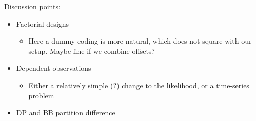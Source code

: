 \documentclass[11pt,a4paper]{article}
\theoremstyle{definition} %
\theoremstyle{case}
\newcommand{\FD}[1]{\textcolor{red}{Fabian: #1 }}
\begin{document}
Discussion points:
\begin{itemize}
    \item Factorial designs
    \begin{itemize}
        \item Here a dummy coding is more natural, which does not square with our setup. Maybe fine if we combine offsets?
    \end{itemize}
    \item Dependent observations
    \begin{itemize}
        \item Either a relatively simple (?) change to the likelihood, or a time-series problem
    \end{itemize}
    \item DP and BB partition difference
\end{itemize}

\end{document}
